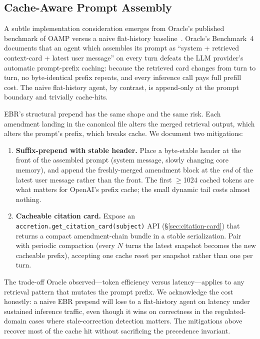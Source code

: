 \documentclass[runningheads]{llncs}
\begin{document}
\subsection{Cache-Aware Prompt Assembly}
\label{sec:cache-aware}

A subtle implementation consideration emerges from Oracle's published
benchmark of OAMP versus a naive flat-history
baseline~\cite{oracleAgentMemoryBenchmarks2026}. Oracle's Benchmark~4
documents that an agent which assembles its prompt as ``system + retrieved
context-card + latest user message'' on every turn defeats the LLM
provider's automatic prompt-prefix caching: because the retrieved card
changes from turn to turn, no byte-identical prefix repeats, and every
inference call pays full prefill cost. The naive flat-history agent, by
contrast, is append-only at the prompt boundary and trivially cache-hits.

EBR's structural prepend has the same shape and the same risk. Each
amendment landing in the canonical file alters the merged retrieval
output, which alters the prompt's prefix, which breaks cache. We document
two mitigations:

\begin{enumerate}
  \item \textbf{Suffix-prepend with stable header.} Place a byte-stable
    header at the front of the assembled prompt (system message, slowly
    changing core memory), and append the freshly-merged amendment block
    at the \emph{end} of the latest user message rather than the front.
    The first $\geq$1024 cached tokens are what matters for OpenAI's
    prefix cache; the small dynamic tail costs almost nothing.
  \item \textbf{Cacheable citation card.} Expose an
    \texttt{accretion.get\_citation\_card(subject)} API
    (\S\ref{sec:citation-card}) that returns a compact amendment-chain
    bundle in a stable serialization. Pair with periodic compaction
    (every $N$ turns the latest snapshot becomes the new cacheable
    prefix), accepting one cache reset per snapshot rather than one per
    turn.
\end{enumerate}

The trade-off Oracle observed---token efficiency versus latency---applies
to any retrieval pattern that mutates the prompt prefix. We acknowledge
the cost honestly: a naive EBR prepend will lose to a flat-history agent
on latency under sustained inference traffic, even though it wins on
correctness in the regulated-domain cases where stale-correction
detection matters. The mitigations above recover most of the cache hit
without sacrificing the precedence invariant.
\end{document}
